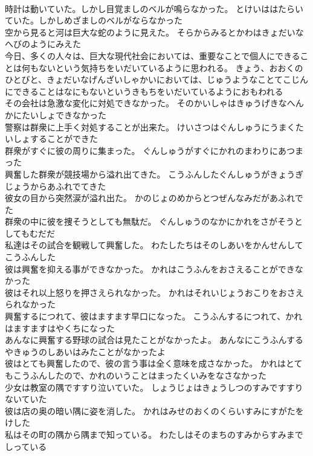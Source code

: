 \documentclass[8pt]{extreport}
\begin{document}
\begin{CJK}{UTF8}{min}
\\	時計は動いていた。しかし目覚ましのベルが鳴らなかった。	とけいははたらいていた。しかしめざましのベルがならなかった 
\\	空から見ると河は巨大な蛇のように見えた。	そらからみるとかわはきょだいなへびのようにみえた 
\\	今日、多くの人々は、巨大な現代社会においては、重要なことで個人にできることは何もないという気持ちをいだいているように思われる。	きょう、おおくのひとびと、きょだいなげんざいしゃかいにおいては、じゅうようなことてこじんにできることはなにもないというきもちをいだいているようにおもわれる 
\\	その会社は急激な変化に対処できなかった。	そのかいしゃはきゅうげきなへんかにたいしょできなかった 
\\	警察は群衆に上手く対処することが出来た。	けいさつはぐんしゅうにうまくたいしょすることができた 
\\	群衆がすぐに彼の周りに集まった。	ぐんしゅうがすぐにかれのまわりにあつまった 
\\	興奮した群衆が競技場から溢れ出てきた。	こうふんしたぐんしゅうがきょうぎじょうからあふれでてきた 
\\	彼女の目から突然涙が溢れ出た。	かのじょのめからとつぜんなみだがあふれでた 
\\	群衆の中に彼を捜そうとしても無駄だ。	ぐんしゅうのなかにかれをさがそうとしてもむだだ 
\\	私達はその試合を観戦して興奮した。	わたしたちはそのしあいをかんせんしてこうふんした 
\\	彼は興奮を抑える事ができなかった。	かれはこうふんをおさえることができなかった 
\\	彼はそれ以上怒りを押さえられなかった。	かれはそれいじょうおこりをおさえられなかった 
\\	興奮するにつれて、彼はますます早口になった。	こうふんするにつれて、かれはますますはやくちになった 
\\	あんなに興奮する野球の試合は見たことがなかったよ。	あんなにこうふんするやきゅうのしあいはみたことがなかったよ 
\\	彼はとても興奮したので、彼の言う事は全く意味を成さなかった。	かれはとてもこうふんしたので、かれのいうことはまったくいみをなさなかった 
\\	少女は教室の隅ですすり泣いていた。	しょうじょはきょうしつのすみですすりないていた 
\\	彼は店の奥の暗い隅に姿を消した。	かれはみせのおくのくらいすみにすがたをけした 
\\	私はその町の隅から隅まで知っている。	わたしはそのまちのすみからすみまでしっている 

\end{CJK}
\end{document}
